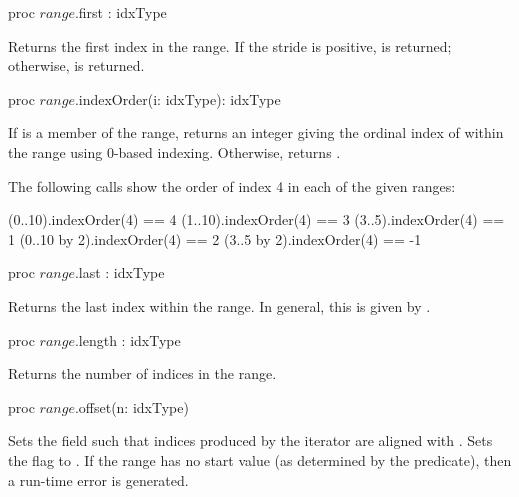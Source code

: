 \begin{protohead}
proc $range$.first : idxType
\end{protohead}
\begin{protobody}
Returns the first index in the range.  If the stride is positive,
 is returned; otherwise,  is returned.
\end{protobody}

\begin{protohead}
proc $range$.indexOrder(i: idxType): idxType
\end{protohead}
\begin{protobody}
If  is a member of the range, returns an integer giving
the ordinal index of  within the range using 0-based indexing.
Otherwise, returns .
\end{protobody}

\begin{example}
The following calls show the order of index 4 in each of the given
ranges:
\begin{chapel}
(0..10).indexOrder(4) == 4
(1..10).indexOrder(4) == 3
(3..5).indexOrder(4) == 1
(0..10 by 2).indexOrder(4) == 2
(3..5 by 2).indexOrder(4) == -1
\end{chapel}
\end{example}
\begin{protohead}

proc $range$.last : idxType
\end{protohead}
\begin{protobody}
Returns the last index within the range.  In general, this is given
by .
\end{protobody}

\begin{protohead}
proc $range$.length : idxType
\end{protohead}
\begin{protobody}
Returns the number of indices in the range.
\end{protobody}

\label{Range_Offset_Method}
\begin{protohead}
proc $range$.offset(n: idxType)
\end{protohead}
\begin{protobody}
Sets the  field such that indices produced by the iterator are
aligned with .  Sets the  flag to .  
If the range has no start value (as determined
by the  predicate), then a run-time error is generated.
\end{protobody}

